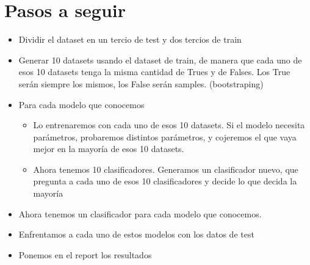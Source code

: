 \section{Pasos a seguir}

\begin{itemize}
    \item Dividir el dataset en un tercio de test y dos tercios de train
    \item Generar 10 datasets usando el dataset de train, de manera que cada uno de esos 10 datasets tenga la misma cantidad de Trues y de Falses. Los True serán siempre los mismos, los False serán samples. (bootstraping)
    \item Para cada modelo que conocemos
    \begin{itemize}
        \item Lo entrenaremos con cada uno de esos 10 datasets. Si el modelo necesita parámetros, probaremos distintos parámetros, y cojeremos el que vaya mejor en la mayoría de esos 10 datasets.
        \item Ahora tenemos 10 clasificadores. Generamos un clasificador nuevo, que pregunta a cada uno de esos 10 clasificadores y decide lo que decida la mayoría
    \end{itemize}
    \item Ahora tenemos un clasificador para cada modelo que conocemos.
    \item Enfrentamos a cada uno de estos modelos con los datos de test
    \item Ponemos en el report los resultados
\end{itemize}
